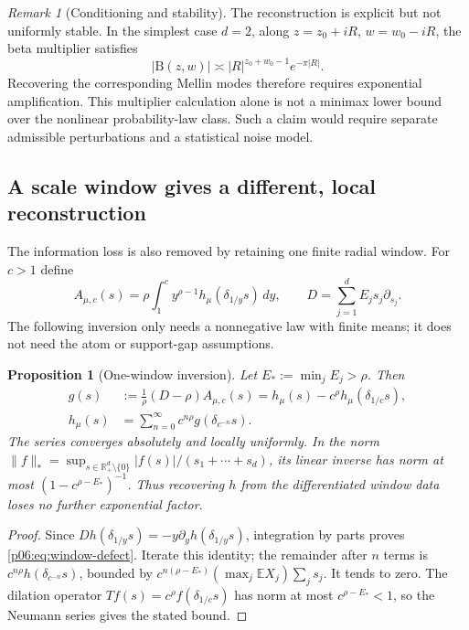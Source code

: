 \documentclass[11pt,letterpaper]{article}
\newtheorem{proposition}[theorem]{Proposition}
\theoremstyle{definition}
\theoremstyle{remark}
\newtheorem{remark}[theorem]{Remark}
\newcommand{\1}{\mathbf 1}
\begin{document}
\begin{remark}[Conditioning and stability]
The reconstruction is explicit but not uniformly stable. In the simplest
case $d=2$, along $z=z_0+iR$, $w=w_0-iR$, the beta multiplier satisfies
\[
 |\mathrm B(z,w)|\asymp
 |R|^{z_0+w_0-1}e^{-\pi|R|}.
\]
Recovering the corresponding Mellin modes therefore requires exponential
amplification. This multiplier calculation alone is not a minimax lower
bound over the nonlinear probability-law class. Such a claim would
require separate admissible perturbations and a statistical noise model.
\end{remark}

\subsection{A scale window gives a different, local reconstruction}

The information loss is also removed by retaining one finite radial
window. For $c>1$ define
\[
 A_{\mu,c}(s)=\rho\int_1^c y^{\rho-1}h_\mu(\delta_{1/y}s)\,dy,
 \qquad D=\sum_{j=1}^dE_js_j\partial_{s_j}.
\]
The following inversion only needs a nonnegative law with finite means;
it does not need the atom or support-gap assumptions.
\begin{proposition}[One-window inversion]\label{p06:prop:window-inversion}
Let $E_*:=\min_jE_j>\rho$. Then
\begin{align}
 g(s)&:=\frac1\rho(D-\rho)A_{\mu,c}(s)
       =h_\mu(s)-c^\rho h_\mu(\delta_{1/c}s),\label{p06:eq:window-defect}\\
 h_\mu(s)&=\sum_{n=0}^\infty
       c^{n\rho}g(\delta_{c^{-n}}s).\label{p06:eq:window-inverse}
\end{align}
The series converges absolutely and locally uniformly. In the norm
$\|f\|_*=\sup_{s\in\mathbb R_+^d\setminus\{0\}}|f(s)|/(s_1+\cdots+s_d)$,
its linear inverse has norm at most
$(1-c^{\rho-E_*})^{-1}$. Thus recovering $h$ from the differentiated
window data loses no further exponential factor.
\end{proposition}
\begin{proof}
Since $D h(\delta_{1/y}s)=-y\partial_yh(\delta_{1/y}s)$,
integration by parts proves \eqref{p06:eq:window-defect}.
Iterate this identity; the remainder after $n$ terms is
$c^{n\rho}h(\delta_{c^{-n}}s)$, bounded by
$c^{n(\rho-E_*)}(\max_j\mathbb EX_j)\sum_js_j$.
It tends to zero. The dilation operator
$Tf(s)=c^\rho f(\delta_{1/c}s)$ has norm at most
$c^{\rho-E_*}<1$, so the Neumann series gives the stated bound.
\end{proof}
\end{document}

